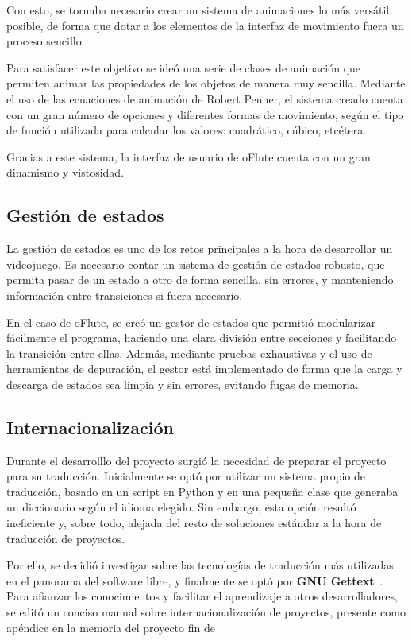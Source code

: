 \documentclass[a4paper,11pt]{article}
\begin{document}
Con esto, se tornaba necesario crear un sistema de animaciones lo más versátil
posible, de forma que dotar a los elementos de la interfaz de movimiento fuera
un proceso sencillo. 

Para satisfacer este objetivo se ideó una serie de clases de animación que
permiten animar las propiedades de los objetos de manera muy sencilla. Mediante
el uso de las ecuaciones de animación de Robert Penner, el sistema creado cuenta
con un gran número de opciones y diferentes formas de movimiento, según el tipo
de función utilizada para calcular los valores: cuadrático, cúbico, etcétera.

Gracias a este sistema, la interfaz de usuario de oFlute cuenta con un gran
dinamismo y vistosidad.

\subsection{Gestión de estados}
La gestión de estados es uno de los retos principales a la hora de desarrollar
un videojuego. Es necesario contar un sistema de gestión de estados robusto, que
permita pasar de un estado a otro de forma sencilla, sin errores, y manteniendo
información entre transiciones si fuera necesario.

En el caso de oFlute, se creó un gestor de estados que permitió modularizar
fácilmente el programa, haciendo una clara división entre secciones y
facilitando la transición entre ellas. Además, mediante pruebas exhaustivas y el
uso de herramientas de depuración, el gestor está implementado de forma que la
carga y descarga de estados sea limpia y sin errores, evitando fugas de memoria.

\subsection{Internacionalización}
Durante el desarrolllo del proyecto surgió la necesidad de preparar el proyecto
para su traducción. Inicialmente se optó por utilizar un sistema propio de
traducción, basado en un script en Python y en una pequeña clase que generaba un
diccionario según el idioma elegido. Sin embargo, esta opción resultó
ineficiente y, sobre todo, alejada del resto de soluciones estándar a la hora de
traducción de proyectos. 

Por ello, se decidió investigar sobre las tecnologías de traducción más
utilizadas en el panorama del software libre, y finalmente se optó por
\textbf{GNU Gettext}~\cite{refgettext}. Para afianzar los conocimientos y
facilitar el aprendizaje a otros desarrolladores, se editó un conciso manual
sobre internacionalización de proyectos, presente como apéndice en la memoria del proyecto fin de
\end{document}

